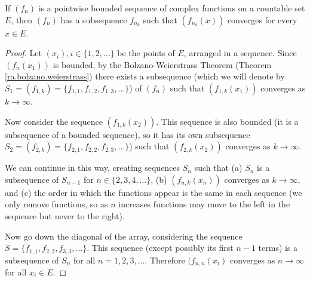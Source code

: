 \begin{theorem}\label{ra.rudin.thm.7.23}

If \((f_n)\) is a pointwise bounded sequence of complex functions on a countable set \(E\), then \((f_n)\) has a subsequence \(f_{n_k}\) such that \((f_{n_k}(x))\) converges for every \(x \in E\).

\end{theorem}

\begin{proof}

Let \((x_i), i \in \{1, 2, \ldots\}\) be the points of \(E\), arranged in a sequence. Since \((f_n(x_1))\) is bounded, by the Bolzano-Weierstrass Theorem (Theorem \ref{ra.bolzano.weierstrass}) there exists a subsequence (which we will denote by \(S_1 = (f_{1,k}) = \{f_{1,1}, f_{1,2}, f_{1,3}, \ldots\}\)) of \((f_n)\) such that \((f_{1,k}(x_1))\) converges as \(k \to \infty\). 

Now consider the sequence \((f_{1,k}(x_2))\). This sequence is also bounded (it is a subsequence of a bounded sequence), so it has its own subsequence \(S_2 = (f_{2,k}) = \{f_{2,1}, f_{2,2}, f_{2,3}, \ldots\}\)) such that \((f_{2,k}(x_2))\) converges as \(k \to \infty\).

We can continue in this way, creating sequences \(S_n\) such that (a) \(S_n\) is a subsequence of \(S_{n-1}\) for \(n \in \{2, 3, 4, \ldots\}\), (b) \((f_{n,k}(x_n))\) converges as \(k \to \infty\), and (c) the order in which the functions appear is the same in each sequence (we only remove functions, so as \(n\) increases functions may move to the left in the sequence but never to the right).

Now go down the diagonal of the array, considering the sequence \(S = \{f_{1,1}, f_{2,2}, f_{3,3}, \ldots\}\). This sequence (except possibly its first \(n-1\) terms) is a subsequence of \(S_n\) for all \(n = 1, 2, 3, \ldots\). Therefore \((f_{n,n}(x_i)\) converges as \(n \to \infty\) for all \(x_i \in E\).

\end{proof}

